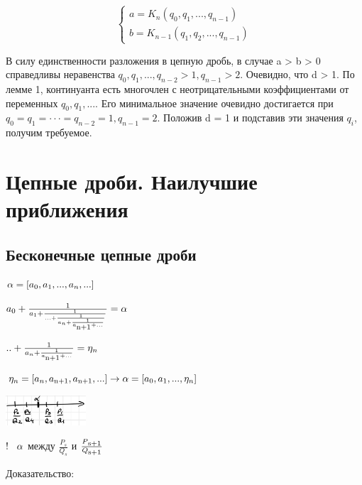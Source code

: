 \documentclass[12pt]{article}
\begin{document}
            \begin{equation}
                \begin{cases}
                    a = K_{n}(q_0,q_1,...,q_{n-1})
                    \\
                    b = K_{n-1}(q_1,q_2,...,q_{n-1})
                \end{cases}
            \end{equation}

            В силу единственности разложения в цепную дробь, в
            случае a > b > 0 справедливы неравенства $q_0,q_1,...,q_{n-2} > 1, q_{n−1} > 2$.
            Очевидно, что d > 1. По лемме 1, континуанта есть многочлен с неотрицательными коэффициентами от переменных $q_0,q_1,...$. Его минимальное
            значение очевидно достигается при $q_0 = q_1 = · · · = q_{n−2} = 1, q_{n−1} = 2$. Положив d = 1 и подставив эти значения $q_i$, получим требуемое.

            \section{Цепные дроби. Наилучшие приближения}
            \subsection{Бесконечные цепные дроби}
        $\alpha = [a_0,a_1,...,a_n,...] \vspace{1 ex}$

$ a_0 + \frac{1}{a_1 + \frac{1}{... + \frac{1}{a_n + \frac{1}{a\textsubscript{n+1} + ...}}}} = \alpha \vspace{1 ex}$

$..+ \frac{1}{a_n + \frac{1}{a\textsubscript{n+1} + ...}} = \eta_n \vspace{2 ex}$

$\eta_n = [a_n,a\textsubscript{n+1}, a\textsubscript{n+1}, ...] \rightarrow \alpha = [a_0,a_1,...,\eta_n]  \vspace{2 ex}$

            \includegraphics[width=30mm]{image.png}

        $! \hspace{2 ex} \alpha$ между $\frac{P_s}{Q_s}$ и $\frac{P\textsubscript{s+1}}{Q\textsubscript{s+1}} $

            Доказательство:
\end{document}
